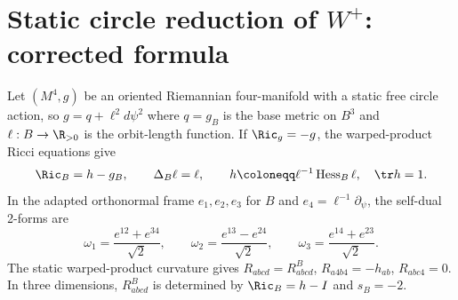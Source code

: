 %
%
%

\section{Static circle reduction of $W^+$: corrected formula}

Let $(M^4,g)$ be an oriented Riemannian four-manifold with a static free
circle action, so $g=q+\ell^2d\psi^2$ where $q=g_B$ is the base metric on
$B^3$ and $\ell:B\to\R_{>0}$ is the orbit-length function.  If $\Ric_g=-g$,
the warped-product Ricci equations give
\begin{equation}\label{eq:static-einstein}
 \Ric_B=h-g_B,\qquad \Delta_B\ell=\ell,\qquad
 h\coloneqq\ell^{-1}\operatorname{Hess}_B\ell,\quad \tr h=1.
\end{equation}
In the adapted orthonormal frame $e_1,e_2,e_3$ for $B$ and $e_4=\ell^{-1}\partial_\psi$,
the self-dual 2-forms are
\[
 \omega_1=\frac{e^{12}+e^{34}}{\sqrt2},\qquad
 \omega_2=\frac{e^{13}-e^{24}}{\sqrt2},\qquad
 \omega_3=\frac{e^{14}+e^{23}}{\sqrt2}.
\]
The static warped-product curvature gives $R_{abcd}=R^B_{abcd}$,
$R_{a4b4}=-h_{ab}$, $R_{abc4}=0$.  In three dimensions,
$R^B_{abcd}$ is determined by $\Ric_B=h-I$ and $s_B=-2$.

